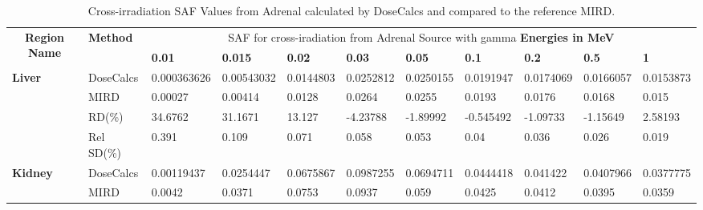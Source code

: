 \documentclass[letterpaper,12pt]{article}
\begin{document}
\begin{table}[H] 
\centering
\caption{Cross-irradiation SAF Values from Adrenal calculated by DoseCalcs and compared to the reference MIRD. } 
\begin{adjustbox}{width=\columnwidth,center}
\begin{threeparttable}
\begin{tabular}{lllllllllll} \hline 
\multicolumn{1}{c}{\multirow{2}{*}{\textbf{Region Name}}} & \multirow{2}{*}{\textbf{Method}} & \multicolumn{9}{c}{ SAF for cross-iradiation from Adrenal Source with gamma \textbf{Energies in MeV}}       \\ \cline{3-11}
                 \multicolumn{1}{c}{}                             & \multicolumn{1}{c}{}                           & \textbf{0.01}   & \textbf{0.015}   & \textbf{0.02}   & \textbf{0.03}   & \textbf{0.05}   & \textbf{0.1}   & \textbf{0.2}   & \textbf{0.5}   & \textbf{1}       \\\hline 
\multirow{4}{*}{\textbf{Liver}}       & DoseCalcs                                         & 0.000363626        & 0.00543032        & 0.0144803        & 0.0252812        & 0.0250155        & 0.0191947        & 0.0174069        & 0.0166057        & 0.0153873        \\ 
                             & MIRD                                        & 0.00027        & 0.00414        & 0.0128        & 0.0264        & 0.0255        & 0.0193        & 0.0176        & 0.0168        & 0.015        \\ 
                             & RD(\%)\tnote{a}                                         & 34.6762        & 31.1671        & 13.127        & -4.23788        & -1.89992        & -0.545492        & -1.09733        & -1.15649        & 2.58193        \\ 
                             & Rel SD(\%)\tnote{b}                                          & 0.391        & 0.109        & 0.071        & 0.058        & 0.053        & 0.04        & 0.036        & 0.026        & 0.019               \\\hline 
\multirow{4}{*}{\textbf{Kidney}}       & DoseCalcs                                         & 0.00119437        & 0.0254447        & 0.0675867        & 0.0987255        & 0.0694711        & 0.0444418        & 0.041422        & 0.0407966        & 0.0377775        \\ 
                             & MIRD                                        & 0.0042        & 0.0371        & 0.0753        & 0.0937        & 0.059        & 0.0425        & 0.0412        & 0.0395        & 0.0359        \\ 

\end{tabular}
\end{threeparttable}
\end{adjustbox}
\end{table}
\end{document}
